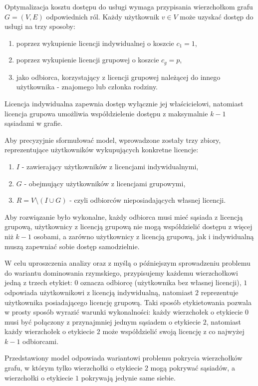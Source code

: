Optymalizacja kosztu dostępu do usługi wymaga przypisania wierzchołkom grafu $G = (V, E)$ odpowiednich ról. Każdy użytkownik $v \in V$ może uzyskać dostęp do usługi na trzy sposoby:
\begin{enumerate}
    \item poprzez wykupienie licencji indywidualnej o koszcie $c_1 = 1$,
    \item poprzez wykupienie licencji grupowej o koszcie $c_g = p$,
    \item jako odbiorca, korzystający z licencji grupowej należącej do innego  użytkownika - znajomego lub członka rodziny.
\end{enumerate}
Licencja indywidualna zapewnia dostęp wyłącznie jej właścicielowi, natomiast licencja grupowa umożliwia współdzielenie dostępu z maksymalnie $k-1$ sąsiadami w grafie. 

Aby precyzyjnie sformułować model, wprowadzone zostały trzy zbiory, reprezentujące użytkowników wykupujących konkretne licencje:
\begin{enumerate}
    \item \textbf{$I$} - zawierający użytkowników z licencjami indywidualnymi,
    \item \textbf{$G$} - obejmujący użytkowników z licencjami grupowymi,
    \item \textbf{$R = V \setminus (I \cup G)$} - czyli odbiorców nieposiadających własnej licencji.
\end{enumerate}
Aby rozwiązanie było wykonalne, każdy odbiorca musi mieć sąsiada z licencją grupową, użytkownicy z licencją grupową nie mogą współdzielić dostępu z więcej niż $k-1$ osobami, a zarówno użytkownicy z licencją grupową, jak i indywidualną muszą zapewniać sobie dostęp samodzielnie.

W celu uproszczenia analizy oraz z myślą o późniejszym sprowadzeniu problemu do wariantu dominowania rzymskiego, przypisujemy każdemu wierzchołkowi jedną z trzech etykiet: $0$ oznacza odbiorcę (użytkownika bez własnej licencji), $1$ odpowiada użytkownikowi z licencją indywidualną, natomiast $2$ reprezentuje użytkownika posiadającego licencję grupową. Taki sposób etykietowania pozwala w prosty sposób wyrazić warunki wykonalności: każdy wierzchołek o etykiecie $0$ musi być połączony z przynajmniej jednym sąsiadem o etykiecie $2$, natomiast każdy wierzchołek o etykiecie $2$ może współdzielić swoją licencję z co najwyżej $k-1$ odbiorcami.

Przedstawiony model odpowiada wariantowi problemu pokrycia wierzchołków grafu, w którym tylko wierzchołki o etykiecie $2$ mogą pokrywać sąsiadów, a wierzchołki o etykiecie $1$ pokrywają jedynie same siebie.

